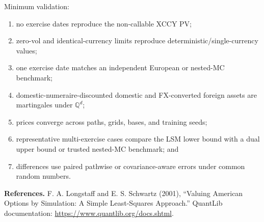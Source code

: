 \documentclass[9pt,letterpaper]{extarticle}
\newcommand{\Qd}{\mathbb{Q}^{d}}
\begin{document}
Minimum validation:
\begin{enumerate}
  \item no exercise dates reproduce the non-callable XCCY PV;
  \item zero-vol and identical-currency limits reproduce deterministic/single-currency values;
  \item one exercise date matches an independent European or nested-MC benchmark;
  \item domestic-numeraire-discounted domestic and FX-converted foreign assets are martingales under $\Qd$;
  \item prices converge across paths, grids, bases, and training seeds;
  \item representative multi-exercise cases compare the LSM lower bound with a dual upper bound or trusted nested-MC benchmark; and
  \item differences use paired pathwise or covariance-aware errors under common random numbers.
\end{enumerate}

\vspace{1pt}
\textbf{References.} F. A. Longstaff and E. S. Schwartz (2001), ``Valuing American Options by Simulation: A Simple Least-Squares Approach.'' QuantLib documentation: \url{https://www.quantlib.org/docs.shtml}.
\end{document}
